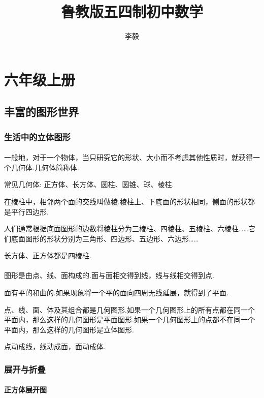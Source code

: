 \documentclass[fontset=windows]{ctexrep}
\begin{document}
\title{鲁教版五四制初中数学}
\author{李毅}
\maketitle
\tableofcontents
\part{六年级上册}
\chapter{丰富的图形世界}
\section{生活中的立体图形}
\subsection{}
\par 一般地，对于一个物体，当只研究它的形状、大小而不考虑其他性质时，就获得一个几何体.几何体简称{\heiti 体}.
\par 常见几何体: 正方体、长方体、圆柱、圆锥、球、棱柱.
\par 在棱柱中，相邻两个面的交线叫做{\heiti 棱}.棱柱上、下底面的形状相同，侧面的形状都是平行四边形.
\par 人们通常根据底面图形的边数将棱柱分为三棱柱、四棱柱、五棱柱、六棱柱……它们底面图形的形状分别为三角形、四边形、五边形、六边形……
\par 长方体、正方体都是四棱柱.
\subsection{}
\par 图形是由点、线、面构成的.面与面相交得到线，线与线相交得到点.
\par 面有平的和曲的.如果现象将一个平的面向四周无线延展，就得到了平面.
\par 点、线、面、体及其组合都是几何图形.如果一个几何图形上的所有点都在同一个平面内，那么这样的几何图形是平面图形.如果一个几何图形上的点都不在同一个平面内，那么这样的几何图形是立体图形.
\par 点动成线，线动成面，面动成体.
\section{展开与折叠}
\subsection{正方体展开图}
\end{document}
